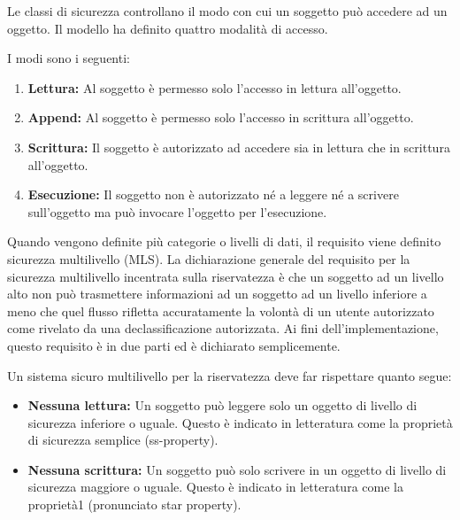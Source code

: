 Le classi di sicurezza controllano il modo con cui un soggetto può accedere ad un oggetto. Il modello ha definito quattro modalità di accesso.

\singlespacing

I modi sono i seguenti:

\begin{enumerate}
    \item \textbf{Lettura:}
    Al soggetto è permesso solo l'accesso in lettura all'oggetto.
    
    \item \textbf{Append:}
    Al soggetto è permesso solo l'accesso in scrittura all'oggetto.
    
    \item \textbf{Scrittura:}
    Il soggetto è autorizzato ad accedere sia in lettura che in scrittura all'oggetto.
    
    \item \textbf{Esecuzione:}
    Il soggetto non è autorizzato né a leggere né a scrivere sull'oggetto ma può invocare l'oggetto per l'esecuzione.
\end{enumerate}

Quando vengono definite più categorie o livelli di dati, il requisito viene definito sicurezza multilivello (MLS). La dichiarazione generale del requisito per la sicurezza multilivello incentrata sulla riservatezza è che un soggetto ad un livello alto non può trasmettere informazioni ad un soggetto ad un livello inferiore a meno che quel flusso rifletta accuratamente la volontà di un utente autorizzato come rivelato da una declassificazione autorizzata. Ai fini dell'implementazione, questo requisito è in due parti ed è dichiarato semplicemente.

\singlespacing

Un sistema sicuro multilivello per la riservatezza deve far rispettare quanto segue:

\begin{itemize}
    \item \textbf{Nessuna lettura:} Un soggetto può leggere solo un oggetto di livello di sicurezza inferiore o uguale. Questo è indicato in letteratura come la proprietà di sicurezza semplice (ss-property).
    
    \item \textbf{Nessuna scrittura:} Un soggetto può solo scrivere in un oggetto di livello di sicurezza maggiore o uguale. Questo è indicato in letteratura come la proprietà1 (pronunciato star property).
\end{itemize}

